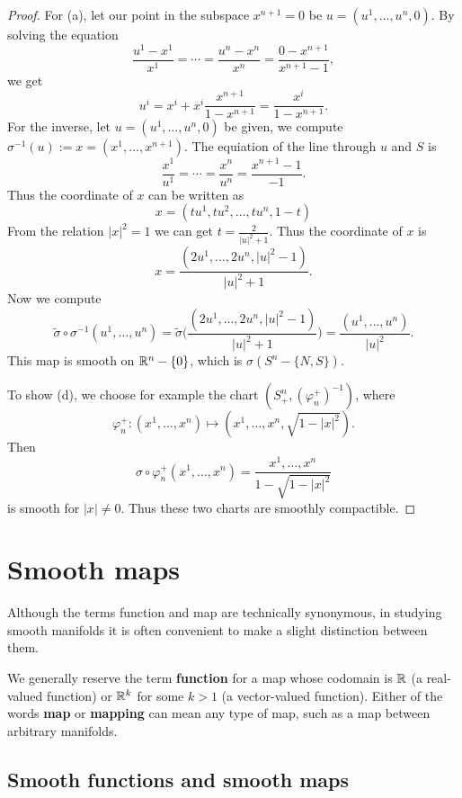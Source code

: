 \begin{proof}
For (a), let our point in the subspace $x^{n+1}=0$ be $u=(u^1,\dots,u^n,0)$. By solving the equation
\[\frac{u^1-x^1}{x^1}=\cdots=\frac{u^n-x^n}{x^n}=\frac{0-x^{n+1}}{x^{n+1}-1},\]
we get
\[u^i=x^i+x^i\frac{x^{n+1}}{1-x^{n+1}}=\frac{x^i}{1-x^{n+1}}.\]
For the inverse, let $u=(u^1,\dots,u^n,0)$ be given, we compute $\sigma^{-1}(u):=x=(x^1,\dots,x^{n+1})$. The equiation of the line through $u$ and $S$ is
\[\frac{x^1}{u^1}=\cdots=\frac{x^n}{u^n}=\frac{x^{n+1}-1}{-1}.\]
Thus the coordinate of $x$ can be written as
\[x=(tu^1,tu^2,\dots,tu^n,1-t)\]
From the relation $|x|^2=1$ we can get $t=\frac{2}{|u|^2+1}$. Thus the coordinate of $x$ is
\[x=\frac{(2u^1,\dots,2u^n,|u|^2-1)}{|u|^2+1}.\]
Now we compute
\[\tilde{\sigma}\circ\sigma^{-1}(u^1,\dots,u^n)=\tilde{\sigma}\Big(\frac{(2u^1,\dots,2u^n,|u|^2-1)}{|u|^2+1}\Big)=\frac{(u^1,\dots,u^n)}{|u|^2}.\]
This map is smooth on $\mathbb{R}^n-\{0\}$, which is $\sigma(S^n-\{N,S\})$.\par
To show (d), we choose for example the chart $(S^n_+,(\varphi_n^{+})^{-1})$, where 
\[\varphi_n^+:(x^1,\dots,x^n)\mapsto(x^1,\dots,x^n,\sqrt{1-|x|^2}).\] 
Then
\[\sigma\circ\varphi_n^+(x^1,\dots,x^n)=\frac{x^1,\dots,x^n}{1-\sqrt{1-|x|^2}}\]
is smooth for $|x|\neq 0$. Thus these two charts are smoothly compactible.
\end{proof}
\chapter{Smooth maps}
Although the terms function and map are technically synonymous, in studying smooth manifolds it is often convenient to make a slight distinction between them.\par
We generally reserve the term \textbf{function} for a map whose codomain is $\mathbb{R}$ (a real-valued function) or $\mathbb{R}^k$ for some $k>1$ (a vector-valued function). Either of the words \textbf{map} or \textbf{mapping} can mean any type of map, such as a map between arbitrary manifolds.
\section{Smooth functions and smooth maps}
